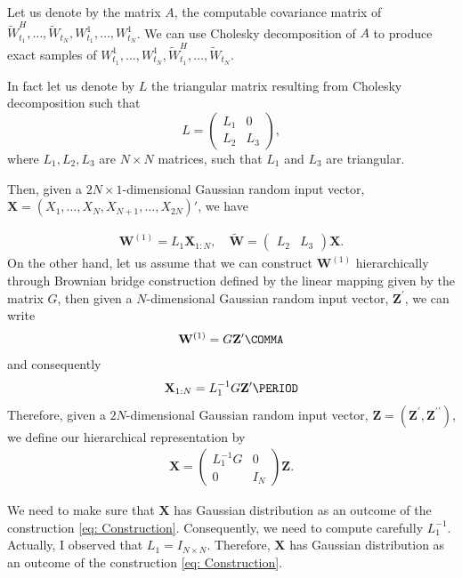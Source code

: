 Let us denote by the matrix $A$, the computable covariance matrix of  $ \widetilde{W}^H_{t_1},\dots, \widetilde{W}_{t_N},W^1_{t_1},\dots, W^1_{t_N}$.  We can use Cholesky decomposition of $A$ to produce exact samples of $W^1_{t_1},\dots, W^1_{t_N}, \widetilde{W}^H_{t_1},\dots, \widetilde{W}_{t_N}$.

In fact let us denote by $L$ the triangular matrix resulting from Cholesky decomposition such that 
\[
L=
\left(
\begin{array}{c|c}
L_1& 0 \\
L_2 & L_3
\end{array}
\right),
\]
where $L_1, L_2,L_3$ are $N \times N$ matrices, such that $L_1$ and $L_3$ are triangular.

Then, given  a $2 N \times 1$-dimensional Gaussian random input vector, $\mathbf{X}=(X_1, \dots,X_N, X_{N+1}, \dots, X_{2N})'$, we have

\begin{align}
\mathbf{W}^{(1)}=L_1 \mathbf{X}_{1:N}, \quad \widetilde{\mathbf{W}}= 
\left(
\begin{array}{c|c}
L_2 & L_3 
\end{array}
\right) \mathbf{X}.
\end{align}
On the other hand, let us assume that we can construct $\mathbf{W}^{(1)}$ hierarchically  through  Brownian bridge construction defined by the linear mapping given by the matrix $G$, then given a $ N$-dimensional Gaussian random input vector, $\mathbf{Z}^\prime$, we can write
\begin{align*}
\mathbf{W}^{(1)}=G  \mathbf{Z}^\prime \COMMA
\end{align*}
and consequently
\begin{align*}
 \mathbf{X}_{1:N}= L_1^{-1} G  \mathbf{Z}^\prime \PERIOD
\end{align*}
Therefore, given a $2 N$-dimensional Gaussian random input vector, $\mathbf{Z}=(\mathbf{Z}^\prime,\mathbf{Z}^{\prime \prime})$, we define our hierarchical representation by
\begin{align}\label{eq: Construction}
\mathbf{X}=\left(
\begin{array}{c|c}
L_1^{-1} G & 0\\
0 & I_{N} 
\end{array}
\right) \mathbf{Z}.
\end{align}

We need to make sure that $\mathbf{X}$  has Gaussian distribution as an outcome of the construction \eqref{eq: Construction}. Consequently, we need to compute carefully $L_1^{-1}$. Actually, I observed that $L_1=I_{N \times N}.$ Therefore,  $\mathbf{X}$  has Gaussian distribution as an outcome of the construction \eqref{eq: Construction}.




